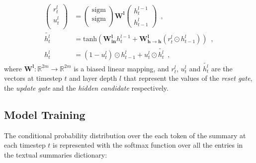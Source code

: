 \documentclass[preprint,5p]{elsarticle}
\begin{document}
\begin{align} 
  \left (
    \begin{array}{l}
      r_t^l \\
      u_t^l \\
    \end{array}
  \right ) &= \left (
    \begin{array}{l}
      \text{sigm} \\
      \text{sigm} \\
    \end{array}
  \right ) \mathbf{W^l} \left (
    \begin{array}{l}
      h_{t}^{l-1}\\
      h_{t-1}^{l}
    \end{array}
  \right ) \enspace,\\
  \widetilde{h_t^l} & = \text{tanh}(\mathbf{W_{in}^l}h_{t}^{l-1} + \mathbf{W_{h \rightarrow h}^l} (r_t^l \odot h_{t-1}^{l}))\enspace,\\
  h_t^l & = (1 - u_t^l) \odot h_{t-1}^{l} + u_t^l \odot \widetilde{h_t^l}\enspace,
\end{align}where $\mathbf{W^l}:\mathbb{R}^{2m} \rightarrow \mathbb{R}^{2m}$ is a biased linear mapping, and $r_t^l$, $u_t^l$ and $\widetilde{h_t^l}$ are the vectors at timestep $t$ and layer depth $l$ that represent the values of the \textit{reset gate}, the \textit{update gate} and the \textit{hidden candidate} respectively.






 
\subsection{Model Training}
\label{subsec:ModelTraining}

The conditional probability distribution over the each token of the summary at each timestep $t$ is represented with the softmax function over all the entries in the textual summaries dictionary:
\end{document}
